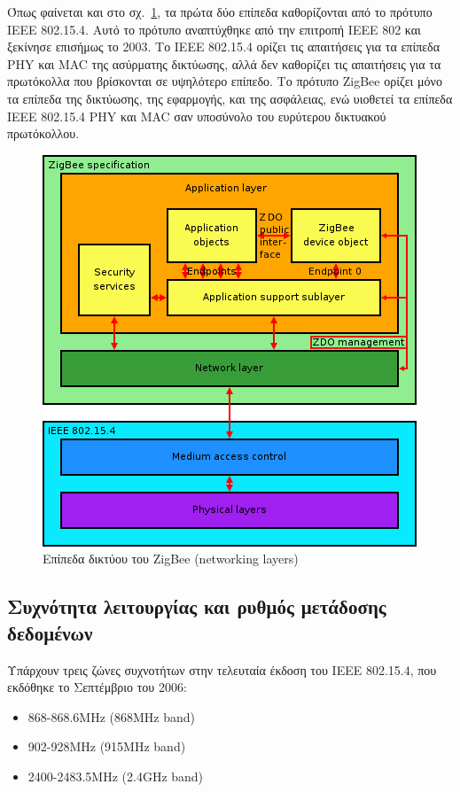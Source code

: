 \documentclass[12pt, a4paper, oneside]{report}
\begin{document}
Όπως φαίνεται και στο σχ.~\ref{eik14}, τα πρώτα δύο επίπεδα καθορίζονται από το πρότυπο IEEE 802.15.4. Αυτό το πρότυπο αναπτύχθηκε από την επιτροπή IEEE 802 και ξεκίνησε επισήμως το 2003. Το IEEE 802.15.4 ορίζει τις απαιτήσεις για τα επίπεδα PHY και MAC της ασύρματης δικτύωσης, αλλά δεν καθορίζει τις απαιτήσεις για τα πρωτόκολλα που βρίσκονται σε υψηλότερο επίπεδο. Το πρότυπο ZigBee ορίζει μόνο τα επίπεδα της δικτύωσης, της εφαρμογής, και της ασφάλειας, ενώ υιοθετεί τα επίπεδα IEEE 802.15.4 PHY και MAC σαν υποσύνολο του ευρύτερου δικτυακού πρωτόκολλου.
\begin{figure}[!ht]
\centering
\includegraphics{eikona_14}
\caption[Επίπεδα δικτύου του ZigBee (networking layers)]{Επίπεδα δικτύου του ZigBee (networking layers)\cite{zigbee}}\label{eik14}
\end{figure}

\subsection{Συχνότητα λειτουργίας και ρυθμός μετάδοσης δεδομένων}

Υπάρχουν τρεις ζώνες συχνοτήτων στην τελευταία έκδοση του IEEE 802.15.4, που εκδόθηκε το Σεπτέμβριο του 2006:
\begin{itemize}
\item 868-868.6MHz (868MHz band)
\item 902-928MHz (915MHz band)
\item 2400-2483.5MHz (2.4GHz band)
\end{itemize}
\end{document}
